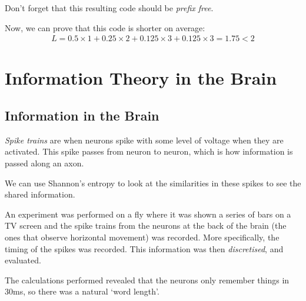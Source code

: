 \documentclass[11pt,a4paper,titlepage,dvipsnames,cmyk]{scrartcl}
\begin{document}
Don't forget that this resulting code should be \textit{prefix free}.

Now, we can prove that this code is shorter on average:
\begin{align*}
L = 0.5 \times 1 + 0.25 \times 2 + 0.125 \times 3 + 0.125 \times 3 = 1.75 < 2
\end{align*}

\section{Information Theory in the Brain}
\subsection{Information in the Brain}
\textit{Spike trains} are when neurons spike with some level of voltage when they are activated. This spike passes from neuron to neuron, which is how information is passed along an axon.

We can use Shannon's entropy to look at the similarities in these spikes to see the shared information.

An experiment was performed on a fly where it was shown a series of bars on a TV screen and the spike trains from the neurons at the back of the brain (the ones that observe horizontal movement) was recorded. More specifically, the timing of the spikes was recorded. This information was then \textit{discretised}, and evaluated.

The calculations performed revealed that the neurons only remember things in 30ms, so there was a natural `word length'. 
\end{document}

